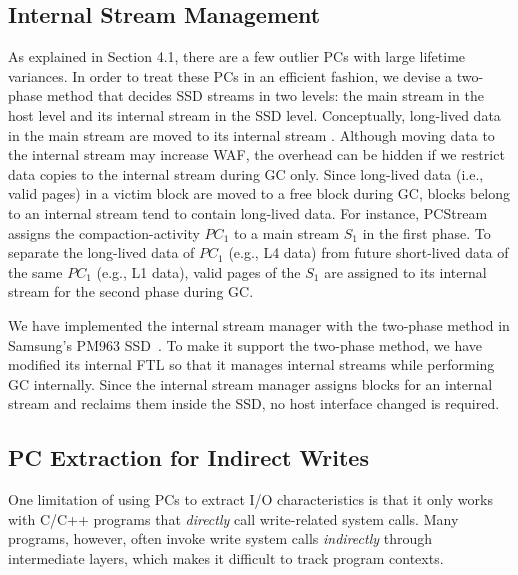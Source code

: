\subsection{Internal Stream Management}
\vspace{-5pt}
As explained in Section 4.1, there are a few outlier PCs with large lifetime
variances. In order to treat these PCs in an efficient fashion, we devise a
two-phase method that decides SSD streams in two levels: the main stream in the
host level and its internal stream in the SSD level.  Conceptually, long-lived
data in the main stream are moved to its internal stream .
Although moving data to the internal stream may increase WAF, the overhead can
be hidden if we restrict data copies to the internal stream during GC only.
Since long-lived data (i.e., valid pages) in a victim block are moved to a free
block during GC, blocks belong to an internal stream tend to contain long-lived
data.  For instance, \textsf{\small PCStream} assigns the compaction-activity
{\it $PC_1$} to a main stream {\it $S_1$} in the first phase.  To separate the
long-lived data of {\it $PC_1$} (e.g., L4 data) from future short-lived data of
the same {\it $PC_1$} (e.g., L1 data), valid pages of the {\it $S_1$} are
assigned to its internal stream for the second phase during GC.

We have implemented the internal stream manager with the two-phase method in
Samsung's PM963 SSD~\cite{PM963}. To make it support the two-phase method, we
have modified its internal FTL so that it manages internal streams while
performing GC internally.  Since the internal stream manager assigns blocks for
an internal stream and reclaims them inside the SSD, no host interface changed
is required.


\vspace{-10pt}
\subsection{PC Extraction for Indirect Writes}
\vspace{-5pt}
One limitation of using PCs to extract I/O characteristics is that it only
works with C/C++ programs that \textit{directly} call write-related system
calls.  Many programs, however, often invoke write system calls
\textit{indirectly} through intermediate layers, which makes it difficult to
track program contexts.

